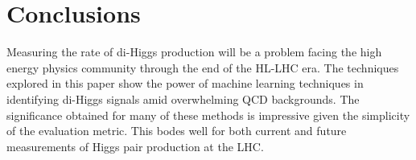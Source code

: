 \section{Conclusions}
\label{sec:conclusions}
Measuring the rate of di-Higgs production will be a problem facing the high energy physics community through the end of the HL-LHC era. The techniques explored in this paper show the power of machine learning techniques in identifying di-Higgs signals amid overwhelming QCD backgrounds. The significance obtained for many of these methods is impressive given the simplicity of the evaluation metric. This bodes well for both current and future measurements of Higgs pair production at the LHC.

